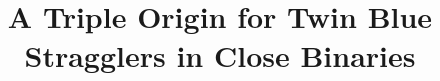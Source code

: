 \documentclass[twocolumn]{aastex62}
\begin{document}
\title{A Triple Origin for Twin Blue Stragglers in Close Binaries}


\end{document}

